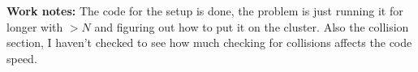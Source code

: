 \textbf{Work notes:} The code for the setup is done, the problem is just running it for longer with $>N$ and figuring out how to put it on the cluster. Also the collision section, I haven't checked to see how much checking for collisions affects the code speed.

	 
